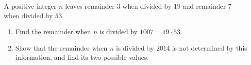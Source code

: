 A positive integer $n$ leaves remainder $3$ when divided by $19$ and remainder $7$ when divided by $53$.
\begin{enumerate}
\item[(a)] Find the remainder when $n$ is divided by $1007=19\cdot53$.
\item[(b)] Show that the remainder when $n$ is divided by $2014$ is not determined by this information, and find its two possible values.
\end{enumerate}
